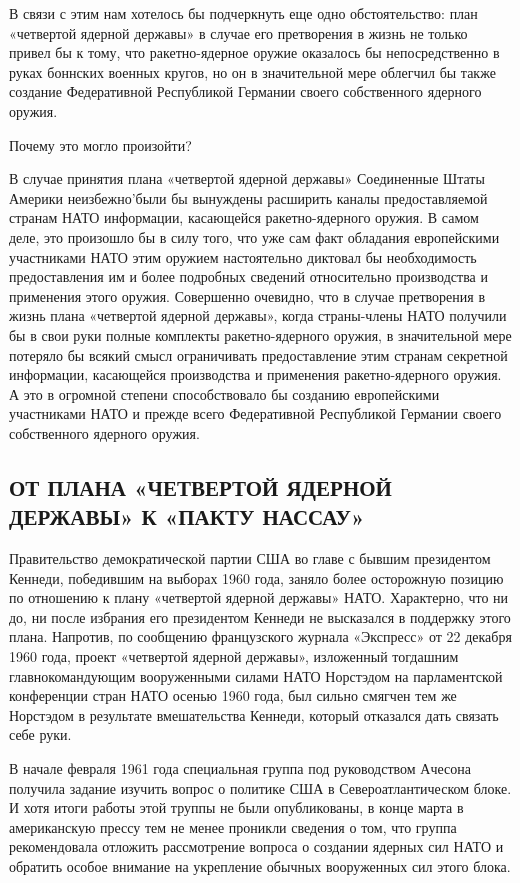 \documentclass[12pt, a4paper, openany]{book}
\begin{document}
	В связи с этим нам хотелось бы подчеркнуть еще одно обстоятельство: план «четвертой ядерной державы» в случае его претворения в жизнь не только привел бы к тому, что ракетно-ядерное оружие оказалось бы непосредственно в руках боннских военных кругов, но он в значительной мере облегчил бы также создание Федеративной Республикой Германии своего собственного ядерного оружия.
	
	Почему это могло произойти?
	
	В случае принятия плана «четвертой ядерной державы» Соединенные Штаты Америки неизбежно'были бы вынуждены расширить каналы предоставляемой странам НАТО информации, касающейся ракетно-ядерного оружия. В самом деле, это произошло бы в силу того, что уже сам факт обладания европейскими участниками НАТО этим оружием настоятельно диктовал бы необходимость предоставления им и более подробных сведений относительно производства и применения этого оружия. Совершенно очевидно, что в случае претворения в жизнь плана «четвертой ядерной державы», когда страны-члены НАТО получили бы в свои руки полные комплекты ракетно-ядерного оружия, в значительной мере потеряло бы всякий смысл ограничивать предоставление этим странам секретной информации, касающейся производства и применения ракетно-ядерного оружия. А это в огромной степени способствовало бы созданию европейскими участниками НАТО и прежде всего Федеративной Республикой Германии своего собственного ядерного оружия.
	
			\subsection[От плана «четвертой ядерной державы» к «пакту Нассау»]{\center ОТ ПЛАНА «ЧЕТВЕРТОЙ ЯДЕРНОЙ ДЕРЖАВЫ» К «ПАКТУ НАССАУ»}

	
	Правительство демократической партии США во главе с бывшим президентом Кеннеди, победившим на выборах 1960 года, заняло более осторожную позицию по отношению к плану «четвертой ядерной державы» НАТО. Характерно, что ни до, ни после избрания его президентом Кеннеди не высказался в поддержку этого плана. Напротив, по сообщению французского журнала «Экспресс» от 22 декабря 1960 года, проект «четвертой ядерной державы», изложенный тогдашним главнокомандующим вооруженными силами НАТО Норстэдом на парламентской конференции стран НАТО осенью 1960 года, был сильно смягчен тем же Норстэдом в результате вмешательства Кеннеди, который отказался дать связать себе руки.
	
	В начале февраля 1961 года специальная группа под руководством Ачесона получила задание изучить вопрос о политике США в Североатлантическом блоке. И хотя итоги работы этой труппы не были опубликованы, в конце марта в американскую прессу тем не менее проникли сведения о том, что группа рекомендовала отложить рассмотрение вопроса о создании ядерных сил НАТО и обратить особое внимание на укрепление обычных вооруженных сил этого блока.
	
\end{document}
